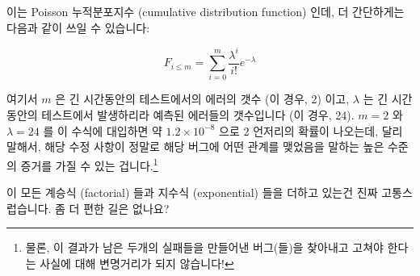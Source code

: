 이는 Poisson 누적분포지수 (cumulative distribution function) 인데, 더
간단하게는 다음과 같이 쓰일 수 있습니다:

\begin{equation}
	F_{i \le m} = \sum_{i=0}^m \frac{\lambda^i}{i!} e^{-\lambda}
\label{eq:debugging:Possion CDF}
\end{equation}

여기서 $m$ 은 긴 시간동안의 테스트에서의 에러의 갯수 (이 경우, 2) 이고,
$\lambda$ 는 긴 시간동안의 테스트에서 발생하리라 예측된 에러들의 갯수입니다 (이
경우, 24).
$m=2$ 와 $\lambda=24$ 를 이 수식에 대입하면 약 $1.2 \times 10^{-8}$ 으로 2
언저리의 확률이 나오는데, 달리 말해서, 해당 수정 사항이 정말로 해당 버그에 어떤
관계를 맺었음을 말하는 높은 수준의 증거를 가질 수 있는 겁니다.\footnote{
	물론, 이 결과가 남은 두개의 실패들을 만들어낸 버그(들)을 찾아내고
	고쳐야 한다는 사실에 대해 변명거리가 되지 않습니다!}

\QuickQuiz{}
	이 모든 계승식 (factorial) 들과 지수식 (exponential) 들을 더하고 있는건
	진짜 고통스럽습니다.
	좀 더 편한 길은 없나요?
	\iffalse

